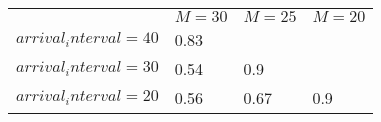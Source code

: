 \begin{tabular}{l  | l  | l  | l }
& \multicolumn{1}{c}{$M=30$} & \multicolumn{1}{c}{$M=25$} & \multicolumn{1}{c}{$M=20$} \\
$arrival_interval=40$ & 0.83 &  &  \\
$arrival_interval=30$ & 0.54 & 0.9 &  \\
$arrival_interval=20$ & 0.56 & 0.67 & 0.9
\end{tabular}